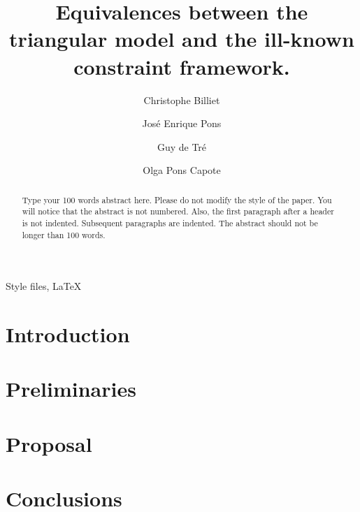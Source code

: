 \documentclass[twocolumn,a4paper]{article}
\theoremstyle{definition}
\begin{document}
\title{Equivalences between the triangular model and the ill-known constraint framework.}

\begin{aug}
\author[1]{Christophe Billiet}
\author[2]{Jos\'{e} Enrique Pons}
\author[1]{Guy de Tr\'{e}}
\author[2]{Olga Pons Capote}
\end{aug}


\maketitle
\thispagestyle{empty}

\begin{abstract}
Type your 100 words abstract here. Please do not modify the style
of the paper. You will notice that the abstract is not numbered. 
Also, the first paragraph after a header is not indented.  Subsequent paragraphs 
are indented. The abstract should not be longer than 100 words.
\end{abstract}

\begin{keywords}
Style files, \LaTeX{}
\end{keywords}

\section{\label{sec:introduction}Introduction}



\section{\label{sec:preliminaries}Preliminaries}


\section{\label{sec:proposal}Proposal}


\section{\label{sec:conclusions}Conclusions}

\end{document}
